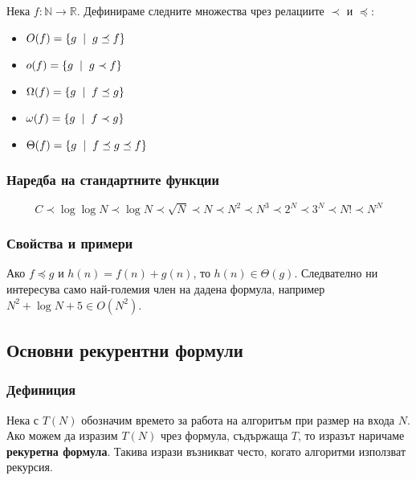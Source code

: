 \documentclass[fleqn,12pt]{article}
\begin{document}
Нека $f : \mathbb{N} \rightarrow \mathbb{R}$. Дефинираме следните множества чрез релациите $\prec$ и $\preceq$:
\begin{itemize}
    \item $O(f) = \{g \hspace{2mm} | \hspace{2mm} g \preceq f\}$
    \item $o(f) = \{g \hspace{2mm} | \hspace{2mm} g \prec f\}$
    \item $\Omega(f) = \{g \hspace{2mm} | \hspace{2mm} f \preceq g\}$
    \item $\omega(f) = \{g \hspace{2mm} | \hspace{2mm} f \prec g\}$
    \item $\Theta(f) = \{g \hspace{2mm} | \hspace{2mm} f \preceq g \preceq f\}$
\end{itemize}

\subsubsection{Наредба на стандартните функции}
\noindent\[ C \prec \log \log N \prec \log N \prec \sqrt{N} \prec N \prec N^2 \prec N^3 \prec 2^N \prec 3^N \prec N! \prec N^N \]

\subsubsection{Свойства и примери}
Ако $f \preceq g$ и $h(n) = f(n) + g(n)$, то $h(n) \in \Theta(g)$.
Следвателно ни интересува само най-големия член на дадена формула, например
$N^2 + \log N + 5 \in O(N^2)$.

\subsection{Основни рекурентни формули}
\subsubsection{Дефиниция}
Нека с $T(N)$ обозначим времето за работа на алгоритъм при размер на входа $N$.
Ако можем да изразим $T(N)$ чрез формула, съдържаща $T$, то изразът наричаме \textbf{рекуретна формула}.
Такива изрази възникват често, когато алгоритми използват рекурсия.
\end{document}

